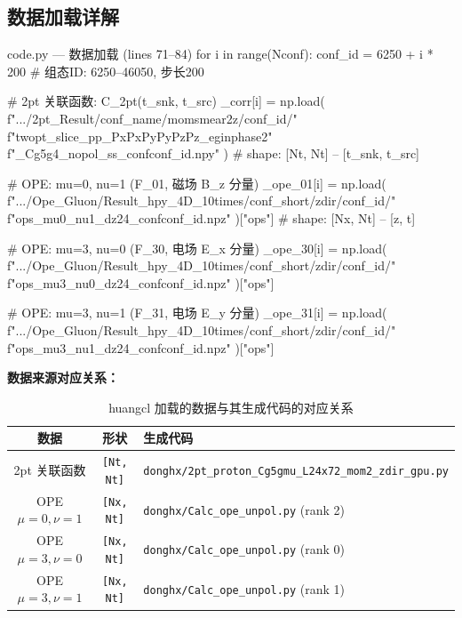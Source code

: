 \documentclass[12pt,a4paper]{ctexart}
\begin{document}
\subsection{数据加载详解}

\begin{codeblock}{code.py --- 数据加载 (lines 71--84)}
for i in range(Nconf):
    conf_id = 6250 + i * 200  # 组态ID: 6250--46050, 步长200

    # 2pt 关联函数: C_2pt(t_snk, t_src)
    _corr[i] = np.load(
        f".../2pt_Result/{conf_name}/momsmear2z/{conf_id}/"
        f"twopt_slice_pp_Px{Px}Py{Py}Pz{Pz}_eginphase2"
        f"_Cg5g4_nopol_ss_conf{conf_id}.npy"
    )
    # shape: [Nt, Nt] -- [t_snk, t_src]

    # OPE: mu=0, nu=1 (F_01, 磁场 B_z 分量)
    _ope_01[i] = np.load(
        f".../Ope_Gluon/Result_hpy_4D_10times/{conf_short}/zdir/{conf_id}/"
        f"ops_mu0_nu1_dz24_conf{conf_id}.npz"
    )["ops"]
    # shape: [Nx, Nt] -- [z, t]

    # OPE: mu=3, nu=0 (F_30, 电场 E_x 分量)
    _ope_30[i] = np.load(
        f".../Ope_Gluon/Result_hpy_4D_10times/{conf_short}/zdir/{conf_id}/"
        f"ops_mu3_nu0_dz24_conf{conf_id}.npz"
    )["ops"]

    # OPE: mu=3, nu=1 (F_31, 电场 E_y 分量)
    _ope_31[i] = np.load(
        f".../Ope_Gluon/Result_hpy_4D_10times/{conf_short}/zdir/{conf_id}/"
        f"ops_mu3_nu1_dz24_conf{conf_id}.npz"
    )["ops"]
\end{codeblock}

\textbf{数据来源对应关系：}

\begin{table}[H]
\centering
\caption{huangcl 加载的数据与其生成代码的对应关系}
\begin{tabular}{c|c|l}
\toprule
\textbf{数据} & \textbf{形状} & \textbf{生成代码} \\
\midrule
2pt 关联函数 & \texttt{[Nt, Nt]} &
    \texttt{donghx/2pt\_proton\_Cg5gmu\_L24x72\_mom2\_zdir\_gpu.py} \\
OPE $\mu=0,\nu=1$ & \texttt{[Nx, Nt]} &
    \texttt{donghx/Calc\_ope\_unpol.py} (rank 2)\\
OPE $\mu=3,\nu=0$ & \texttt{[Nx, Nt]} &
    \texttt{donghx/Calc\_ope\_unpol.py} (rank 0)\\
OPE $\mu=3,\nu=1$ & \texttt{[Nx, Nt]} &
    \texttt{donghx/Calc\_ope\_unpol.py} (rank 1)\\
\bottomrule
\end{tabular}
\end{table}
\end{document}

